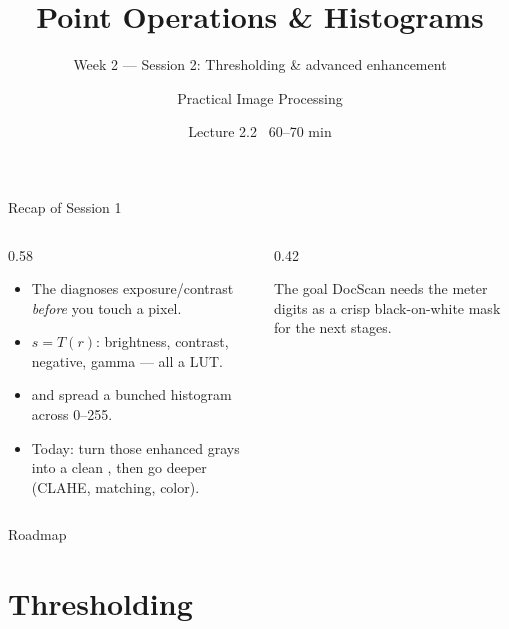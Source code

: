 \documentclass[10pt,aspectratio=169]{beamer}
\title{Point Operations \& Histograms}
\subtitle{Week 2 — Session 2: Thresholding \& advanced enhancement}
\author{Practical Image Processing}
\date{Lecture 2.2 \textbullet\ 60--70 min}
\begin{document}
\maketitle

\begin{frame}{Recap of Session 1}
  \begin{columns}[T]
    \begin{column}{0.58\textwidth}
      \begin{itemize}
        \item The  diagnoses exposure/contrast \emph{before} you touch a pixel.
        \item {} $s=T(r)$: brightness, contrast, negative, gamma — all a LUT.
        \item {} and  spread a bunched histogram across 0--255.
        \item \alert{Today:} turn those enhanced grays into a clean , then go deeper
              (CLAHE, matching, color).
      \end{itemize}
    \end{column}
    \begin{column}{0.42\textwidth}
      \begin{alertblock}{The goal}
        DocScan needs the meter digits as a crisp black-on-white mask for the next stages.
      \end{alertblock}
    \end{column}
  \end{columns}
\end{frame}

\begin{frame}{Roadmap}\tableofcontents\end{frame}

\section{Thresholding}
\end{document}
